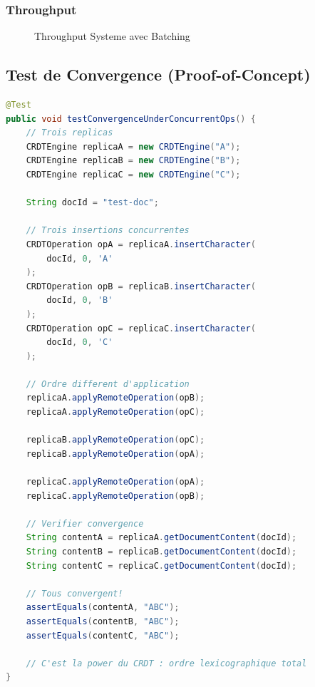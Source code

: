 \documentclass[11pt,a4paper,hidelinks]{book}
\begin{document}
\subsubsection{Throughput}

\begin{figure}[H]
\centering
{}
\caption{Throughput Systeme avec Batching}
\end{figure}

\subsection{Test de Convergence (Proof-of-Concept)}

\begin{lstlisting}[language=Java, caption={Test Convergence CRDT}]
@Test
public void testConvergenceUnderConcurrentOps() {
    // Trois replicas
    CRDTEngine replicaA = new CRDTEngine("A");
    CRDTEngine replicaB = new CRDTEngine("B");
    CRDTEngine replicaC = new CRDTEngine("C");
    
    String docId = "test-doc";
    
    // Trois insertions concurrentes
    CRDTOperation opA = replicaA.insertCharacter(
        docId, 0, 'A'
    );
    CRDTOperation opB = replicaB.insertCharacter(
        docId, 0, 'B'
    );
    CRDTOperation opC = replicaC.insertCharacter(
        docId, 0, 'C'
    );
    
    // Ordre different d'application
    replicaA.applyRemoteOperation(opB);
    replicaA.applyRemoteOperation(opC);
    
    replicaB.applyRemoteOperation(opC);
    replicaB.applyRemoteOperation(opA);
    
    replicaC.applyRemoteOperation(opA);
    replicaC.applyRemoteOperation(opB);
    
    // Verifier convergence
    String contentA = replicaA.getDocumentContent(docId);
    String contentB = replicaB.getDocumentContent(docId);
    String contentC = replicaC.getDocumentContent(docId);
    
    // Tous convergent!
    assertEquals(contentA, "ABC");
    assertEquals(contentB, "ABC");
    assertEquals(contentC, "ABC");
    
    // C'est la power du CRDT : ordre lexicographique total
}
\end{lstlisting}
\end{document}
